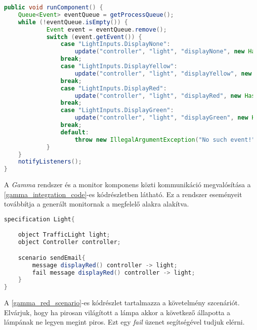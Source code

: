 \begin{lstlisting}[language=java, frame=single, float=ht!, caption={Monitor komponenshez tartozó kódrészlet.},captionpos=b,label=gamma_integration_code]
public void runComponent() {
    Queue<Event> eventQueue = getProcessQueue();
    while (!eventQueue.isEmpty()) {
            Event event = eventQueue.remove();
            switch (event.getEvent()) {
                case "LightInputs.DisplayNone":
                    update("controller", "light", "displayNone", new HashMap<String, Object>());
                break;
                case "LightInputs.DisplayYellow":
                    update("controller", "light", "displayYellow", new HashMap<String, Object>());
                break;
                case "LightInputs.DisplayRed":
                    update("controller", "light", "displayRed", new HashMap<String, Object>());
                break;
                case "LightInputs.DisplayGreen":
                    update("controller", "light", "displayGreen", new HashMap<String, Object>());
                break;
                default:
                    throw new IllegalArgumentException("No such event!");
            }
    }
    notifyListeners();
}
\end{lstlisting}

A \textit{Gamma} rendszer és a monitor komponens közti kommunikáció megvalósítása a \ref{gamma_integration_code}-es kódrészletben látható.
Ez a rendszer eseményeit továbbítja a generált monitornak a megfelelő alakra alakítva.

\begin{lstlisting}[language=java, frame=single, float=ht!, caption={Szenárió szöveges leírása.},captionpos=b, label=gamma_red_scenario]
specification Light{

    object TrafficLight light;
    object Controller controller;

    scenario sendEmail{
        message displayRed() controller -> light;
        fail message displayRed() controller -> light;
    }
}
\end{lstlisting}

A \ref{gamma_red_scenario}-es kódrészlet tartalmazza a követelmény szcenáriót.
Elvárjuk, hogy ha pirosan világított a lámpa akkor a következő állapotta a lámpának ne legyen megint piros.
Ezt egy \textit{fail} üzenet segítségével tudjuk elérni.

